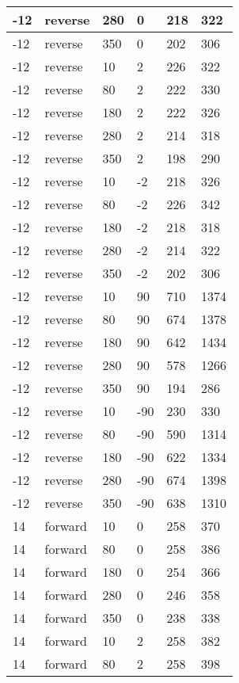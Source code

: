 \begin{table}
\begin{center}
\begin{tabular}{|l|l|l|l|l|l|}
			-12 & reverse & 280 & 0 & 218 & 322 \\
			\hline
			-12 & reverse & 350 & 0 & 202 & 306 \\
			\hline
			-12 & reverse & 10 & 2 & 226 & 322 \\
			\hline
			-12 & reverse & 80 & 2 & 222 & 330 \\
			\hline
			-12 & reverse & 180 & 2 & 222 & 326 \\
			\hline
			-12 & reverse & 280 & 2 & 214 & 318 \\
			\hline
			-12 & reverse & 350 & 2 & 198 & 290 \\
			\hline
			-12 & reverse & 10 & -2 & 218 & 326 \\
			\hline
			-12 & reverse & 80 & -2 & 226 & 342 \\
			\hline
			-12 & reverse & 180 & -2 & 218 & 318 \\
			\hline
			-12 & reverse & 280 & -2 & 214 & 322 \\
			\hline
			-12 & reverse & 350 & -2 & 202 & 306 \\
			\hline
			-12 & reverse & 10 & 90 & 710 & 1374 \\
			\hline
			-12 & reverse & 80 & 90 & 674 & 1378 \\
			\hline
			-12 & reverse & 180 & 90 & 642 & 1434 \\
			\hline
			-12 & reverse & 280 & 90 & 578 & 1266 \\
			\hline
			-12 & reverse & 350 & 90 & 194 & 286 \\
			\hline
			-12 & reverse & 10 & -90 & 230 & 330 \\
			\hline
			-12 & reverse & 80 & -90 & 590 & 1314 \\
			\hline
			-12 & reverse & 180 & -90 & 622 & 1334 \\
			\hline
			-12 & reverse & 280 & -90 & 674 & 1398 \\
			\hline
			-12 & reverse & 350 & -90 & 638 & 1310 \\
			\hline
			14 & forward & 10 & 0 & 258 & 370 \\
			\hline
			14 & forward & 80 & 0 & 258 & 386 \\
			\hline
			14 & forward & 180 & 0 & 254 & 366 \\
			\hline
			14 & forward & 280 & 0 & 246 & 358 \\
			\hline
			14 & forward & 350 & 0 & 238 & 338 \\
			\hline
			14 & forward & 10 & 2 & 258 & 382 \\
			\hline
			14 & forward & 80 & 2 & 258 & 398 \\

\end{tabular}
\end{center}
\end{table}
